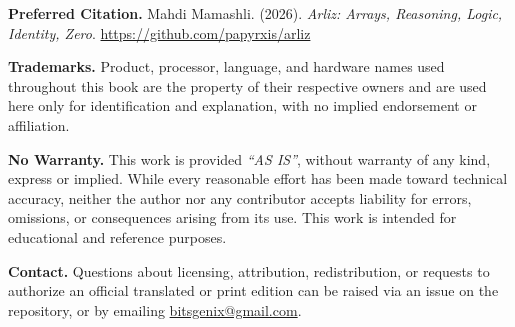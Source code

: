 \begin{flushleft}
{	\vspace{0.8em}

	\textbf{Preferred Citation.} Mahdi Mamashli. (2026). \textit{Arliz: Arrays, Reasoning, Logic,
	Identity, Zero}. \url{https://github.com/papyrxis/arliz}

	\vspace{0.8em}

	\textbf{Trademarks.} Product, processor, language, and hardware names used throughout this
	book are the property of their respective owners and are used here only for identification
	and explanation, with no implied endorsement or affiliation.

	\vspace{0.8em}

	\textbf{No Warranty.} This work is provided \textit{``AS IS''}, without warranty of any
	kind, express or implied. While every reasonable effort has been made toward technical
	accuracy, neither the author nor any contributor accepts liability for errors, omissions,
	or consequences arising from its use. This work is intended for educational and reference
	purposes.

	\vspace{0.8em}

	\textbf{Contact.} Questions about licensing, attribution, redistribution, or requests to
	authorize an official translated or print edition can be raised via an issue on the
	repository, or by emailing \href{mailto:bitsgenix@gmail.com}{bitsgenix@gmail.com}.

	}
\end{flushleft}

\clearpage